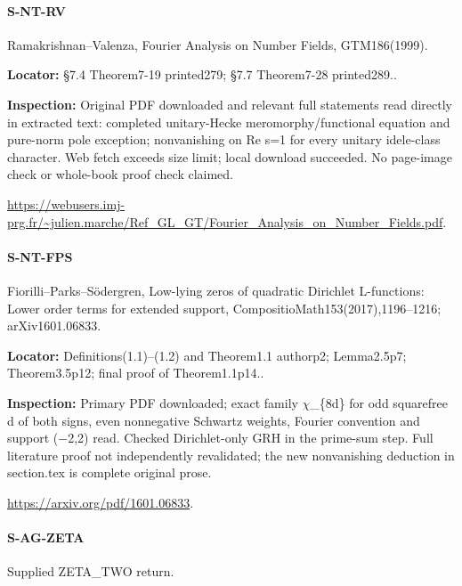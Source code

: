 \documentclass[11pt,a4paper]{article}
\begin{document}
\paragraph{S-NT-RV} Ramakrishnan–\allowbreak{}Valenza, Fourier Analysis on Number Fields, GTM186(1999).

\textbf{Locator:} §7.\allowbreak{}4 Theorem7-19 printed279; §7.\allowbreak{}7 Theorem7-28 printed289.\allowbreak{}.

\textbf{Inspection:} Original PDF downloaded and relevant full statements read directly in extracted text:\allowbreak{} completed unitary-Hecke meromorphy/\allowbreak{}functional equation and pure-norm pole exception; nonvanishing on Re s=1 for every unitary idele-class character.\allowbreak{} Web fetch exceeds size limit; local download succeeded.\allowbreak{} No page-image check or whole-book proof check claimed.\allowbreak{}

\url{https://webusers.imj-prg.fr/~julien.marche/Ref_GL_GT/Fourier_Analysis_on_Number_Fields.pdf}.

\paragraph{S-NT-FPS} Fiorilli–\allowbreak{}Parks–\allowbreak{}Södergren, Low-lying zeros of quadratic Dirichlet L-functions:\allowbreak{} Lower order terms for extended support, CompositioMath153(2017),1196–\allowbreak{}1216; arXiv1601.\allowbreak{}06833.

\textbf{Locator:} Definitions(1.\allowbreak{}1)–\allowbreak{}(1.\allowbreak{}2) and Theorem1.\allowbreak{}1 authorp2; Lemma2.\allowbreak{}5p7; Theorem3.\allowbreak{}5p12; final proof of Theorem1.\allowbreak{}1p14.\allowbreak{}.

\textbf{Inspection:} Primary PDF downloaded; exact family \ensuremath{\chi}\_\allowbreak{}\{8d\} for odd squarefree d of both signs, even nonnegative Schwartz weights, Fourier convention and support (\ensuremath{-}2,2) read.\allowbreak{} Checked Dirichlet-only GRH in the prime-sum step.\allowbreak{} Full literature proof not independently revalidated; the new nonvanishing deduction in section.\allowbreak{}tex is complete original prose.\allowbreak{}

\url{https://arxiv.org/pdf/1601.06833}.

\paragraph{S-AG-ZETA} Supplied ZETA\_\allowbreak{}TWO return.
\end{document}
